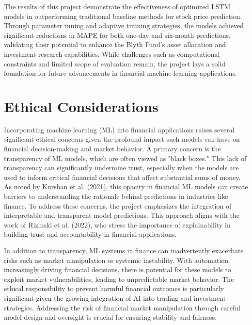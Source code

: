 \documentclass[10pt,twocolumn]{article}
\begin{document}
The results of this project demonstrate the effectiveness of optimized LSTM models in outperforming traditional baseline methods for stock price prediction. Through parameter tuning and adaptive training strategies, the models achieved significant reductions in MAPE for both one-day and six-month predictions, validating their potential to enhance the Blyth Fund’s asset allocation and investment research capabilities. While challenges such as computational constraints and limited scope of evaluation remain, the project lays a solid foundation for future advancements in financial machine learning applications.

\section*{Ethical Considerations}

Incorporating machine learning (ML) into financial applications raises several significant ethical concerns given the profound impact such models can have on financial decision-making and market behavior. A primary concern is the transparency of ML models, which are often viewed as "black boxes." This lack of transparency can significantly undermine trust, especially when the models are used to inform critical financial decisions that affect substantial sums of money. As noted by Kurshan et al. (2021), this opacity in financial ML models can create barriers to understanding the rationale behind predictions in industries like finance\cite{Kurshan2021FairEthicalAI}. To address these concerns, the project emphasizes the integration of interpretable and transparent model predictions. This approach aligns with the work of Rizinski et al. (2022), who stress the importance of explainability in building trust and accountability in financial applications\cite{Rizinski2022EthicalMLFintech}.

In addition to transparency, ML systems in finance can inadvertently exacerbate risks such as market manipulation or systemic instability. With automation increasingly driving financial decisions, there is potential for these models to exploit market vulnerabilities, leading to unpredictable market behavior. The ethical responsibility to prevent harmful financial outcomes is particularly significant given the growing integration of AI into trading and investment strategies. Addressing the risk of financial market manipulation through careful model design and oversight is crucial for ensuring stability and fairness\cite{Rizinski2022EthicalMLFintech}.
\end{document}
